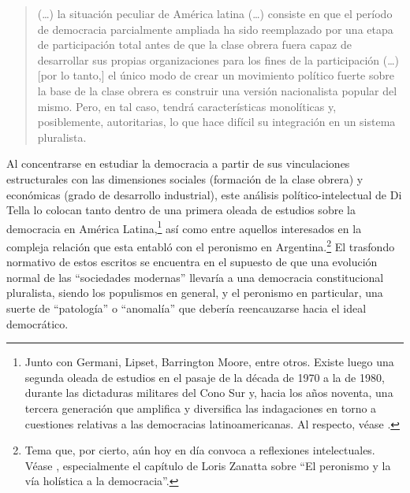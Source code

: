 \begin{quote}
(\dots) la situación peculiar de América latina (\dots) consiste en que el período de democracia parcialmente ampliada ha sido reemplazado por una etapa de participación total antes de que la clase obrera fuera capaz de desarrollar sus propias organizaciones para los fines de la participación (\dots) [por lo tanto,] el único modo de crear un movimiento político fuerte sobre la base de la clase obrera es construir una versión nacionalista popular del mismo. Pero, en tal caso, tendrá características monolíticas y, posiblemente, autoritarias, lo que hace difícil su integración en un sistema pluralista.
\end{quote}

Al concentrarse en estudiar la democracia a partir de sus vinculaciones estructurales con las dimensiones sociales (formación de la clase obrera) y económicas (grado de desarrollo industrial), este análisis político-intelectual de Di Tella lo colocan tanto dentro de una primera oleada de estudios sobre la democracia en América Latina,\footnote{Junto con Germani, Lipset, Barrington Moore, entre otros. Existe luego una segunda oleada de estudios en el pasaje de la década de 1970 a la de 1980, durante las dictaduras militares del Cono Sur y, hacia los años noventa, una tercera generación que amplifica y diversifica las indagaciones en torno a cuestiones relativas a las democracias latinoamericanas. Al respecto, véase \textcite{1554-CAMOU2007}.} así como entre aquellos interesados en la compleja relación que esta entabló con el peronismo en Argentina.\footnote{Tema que, por cierto, aún hoy en día convoca a reflexiones intelectuales. Véase \textcite{1543-NOVARO2014}, especialmente el capítulo de Loris Zanatta sobre \enquote{El peronismo y la vía holística a la democracia}.} El trasfondo normativo de estos escritos se encuentra en el supuesto de que una evolución normal de las \enquote{sociedades modernas} llevaría a una democracia constitucional pluralista, siendo los populismos en general, y el peronismo en particular, una suerte de \enquote{patología} o \enquote{anomalía} que debería reencauzarse hacia el ideal democrático.

